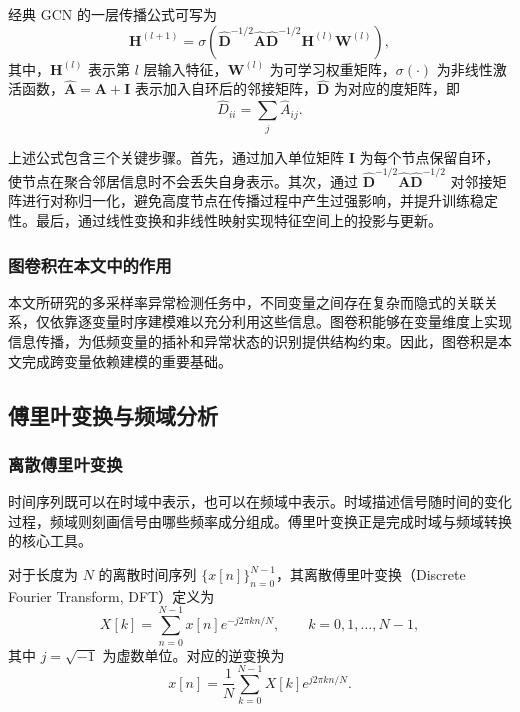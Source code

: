 \documentclass[bachelor, vlined]{DissertUESTC}
\begin{document}
    经典 GCN 的一层传播公式可写为
    \begin{equation}
        \mathbf{H}^{(l+1)} =
        \sigma\!\left(
            \hat{\mathbf{D}}^{-1/2}
            \hat{\mathbf{A}}
            \hat{\mathbf{D}}^{-1/2}
            \mathbf{H}^{(l)}
            \mathbf{W}^{(l)}
        \right),
    \end{equation}
    其中，$\mathbf{H}^{(l)}$ 表示第 $l$ 层输入特征，$\mathbf{W}^{(l)}$ 为可学习权重矩阵，$\sigma(\cdot)$ 为非线性激活函数，$\hat{\mathbf{A}} = \mathbf{A} + \mathbf{I}$ 表示加入自环后的邻接矩阵，$\hat{\mathbf{D}}$ 为对应的度矩阵，即
    \begin{equation}
        \hat{D}_{ii} = \sum_j \hat{A}_{ij}.
    \end{equation}

    上述公式包含三个关键步骤。首先，通过加入单位矩阵 $\mathbf{I}$ 为每个节点保留自环，使节点在聚合邻居信息时不会丢失自身表示。其次，通过 $\hat{\mathbf{D}}^{-1/2}\hat{\mathbf{A}}\hat{\mathbf{D}}^{-1/2}$ 对邻接矩阵进行对称归一化，避免高度节点在传播过程中产生过强影响，并提升训练稳定性。最后，通过线性变换和非线性映射实现特征空间上的投影与更新。

    \subsubsection{图卷积在本文中的作用}

    本文所研究的多采样率异常检测任务中，不同变量之间存在复杂而隐式的关联关系，仅依靠逐变量时序建模难以充分利用这些信息。图卷积能够在变量维度上实现信息传播，为低频变量的插补和异常状态的识别提供结构约束。因此，图卷积是本文完成跨变量依赖建模的重要基础。

    \subsection{傅里叶变换与频域分析}

    \subsubsection{离散傅里叶变换}

    时间序列既可以在时域中表示，也可以在频域中表示。时域描述信号随时间的变化过程，频域则刻画信号由哪些频率成分组成。傅里叶变换正是完成时域与频域转换的核心工具。

    对于长度为 $N$ 的离散时间序列 $\{x[n]\}_{n=0}^{N-1}$，其离散傅里叶变换（Discrete Fourier Transform, DFT）定义为
    \begin{equation}
        X[k] = \sum_{n=0}^{N-1} x[n] e^{-j 2\pi kn / N}, \qquad k = 0,1,\ldots,N-1,
    \end{equation}
    其中 $j = \sqrt{-1}$ 为虚数单位。对应的逆变换为
    \begin{equation}
        x[n] = \frac{1}{N}\sum_{k=0}^{N-1} X[k] e^{j 2\pi kn / N}.
    \end{equation}
\end{document}
